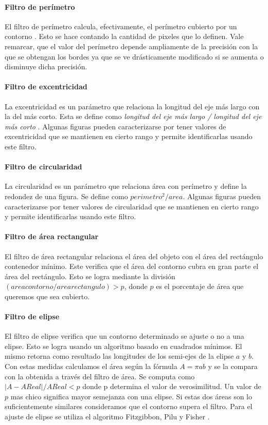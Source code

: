	\paragraph{Filtro de per\'imetro}
	El filtro de per\'imetro calcula, efectivamente, el per\'imetro 
	cubierto por un contorno . Esto se hace contando la cantidad de pixeles que lo definen.
	Vale remarcar, que el valor del per\'imetro depende ampliamente de la precisi\'on con la que se obtengan los bordes ya que se ve dr\'asticamente modificado 
	si se aumenta o disminuye dicha precisi\'on.
	\paragraph{Filtro de excentricidad}
	La excentricidad es un par\'ametro que relaciona la longitud del eje 
	m\'as largo con la del m\'as corto. Esta se define como 
	\textit { longitud del eje m\'as largo / longitud del eje m\'as corto}  . Algunas figuras pueden caracterizarse por tener valores de excentricidad
	que se mantienen en cierto rango y permite identificarlas usando este filtro.
	\paragraph{Filtro de circularidad}
	La circularidad es un par\'ametro que relaciona \'area con per\'imetro y define la redondez de una figura. Se define como $perimetro^2/area$. Algunas figuras pueden 
	caracterizarse por tener valores de circularidad que se mantienen en cierto rango y permite identificarlas usando este filtro.
	\paragraph{Filtro de \'area rectangular}
	El filtro de \'area rectangular relaciona el \'area del objeto con el \'area del rect\'angulo contenedor m\'inimo. Este verifica que el \'area
	del contorno cubra en gran parte el \'area del rect\'angulo. Esto se logra mediante la divisi\'on $(area contorno / area rectangulo)> p$, donde 
	$p$ es el porcentaje de \'area que queremos que sea cubierto.
	\paragraph{Filtro de elipse}
	El filtro de elipse verifica que un contorno determinado se ajuste o no a una elipse. Esto se logra usando un algoritmo basado 
	en cuadrados m\'inimos. El mismo retorna como resultado las longitudes de los semi-ejes de la elipse $a$ y $b$. Con estas medidas calculamos
	el \'area seg\'un la f\'ormula $A=\pi a  b$ y se la compara con la 
	obtenida a trav\'es del filtro de \'area. Se computa como $|A-AReal|/ 
	AReal < p$ donde p determina el
	valor de verosimilitud. Un valor de $p$ mas chico significa mayor 
	semejanza con una elipse. Si estas dos \'areas son lo suficientemente similares consideramos que el contorno supera el filtro. 
	Para el ajuste de elipse se utiliza el algoritmo Fitzgibbon, Pilu y Fisher \cite{Fitzgibbon99}.
